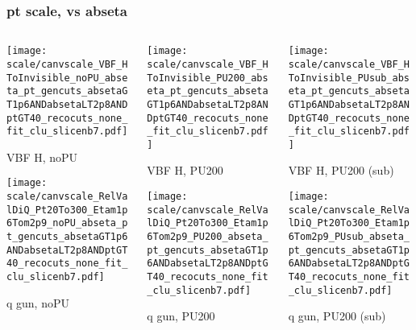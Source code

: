 \documentclass[8pt]{beamer}
\begin{document}
  \begin{frame}
  \frametitle{pt scale, vs abseta}
  
  \begin{columns}
   \begin{column}{0.35\textwidth}
     \texttt{[image: scale/canvscale\_VBF\_HToInvisible\_noPU\_abseta\_pt\_gencuts\_absetaGT1p6ANDabsetaLT2p8ANDptGT40\_recocuts\_none\_fit\_clu\_slicenb7.pdf]}
     
     VBF H, noPU
    
     \texttt{[image: scale/canvscale\_RelValDiQ\_Pt20To300\_Etam1p6Tom2p9\_noPU\_abseta\_pt\_gencuts\_absetaGT1p6ANDabsetaLT2p8ANDptGT40\_recocuts\_none\_fit\_clu\_slicenb7.pdf]}
     
     q gun, noPU
   \end{column}
   \begin{column}{0.35\textwidth}
     \texttt{[image: scale/canvscale\_VBF\_HToInvisible\_PU200\_abseta\_pt\_gencuts\_absetaGT1p6ANDabsetaLT2p8ANDptGT40\_recocuts\_none\_fit\_clu\_slicenb7.pdf]}
     
     VBF H, PU200
    
     \texttt{[image: scale/canvscale\_RelValDiQ\_Pt20To300\_Etam1p6Tom2p9\_PU200\_abseta\_pt\_gencuts\_absetaGT1p6ANDabsetaLT2p8ANDptGT40\_recocuts\_none\_fit\_clu\_slicenb7.pdf]}
     
     q gun, PU200
   \end{column}
   \begin{column}{0.35\textwidth}
     \texttt{[image: scale/canvscale\_VBF\_HToInvisible\_PUsub\_abseta\_pt\_gencuts\_absetaGT1p6ANDabsetaLT2p8ANDptGT40\_recocuts\_none\_fit\_clu\_slicenb7.pdf]}
     
     VBF H, PU200 (sub)
    
     \texttt{[image: scale/canvscale\_RelValDiQ\_Pt20To300\_Etam1p6Tom2p9\_PUsub\_abseta\_pt\_gencuts\_absetaGT1p6ANDabsetaLT2p8ANDptGT40\_recocuts\_none\_fit\_clu\_slicenb7.pdf]}
     
     q gun, PU200 (sub)
   \end{column}
  \end{columns}
 \end{frame}
 
\end{document}
